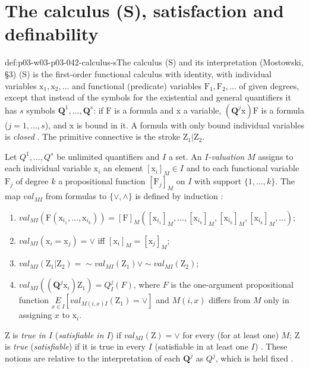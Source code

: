 \section{The calculus (S), satisfaction and definability}
\label{sec:p03-w03-p03-042-calculus}

\begin{hbdefinition}{def:p03-w03-p03-042-calculus-s}{The calculus (S) and its interpretation (Mostowski, \S3)}
(S) is the first-order functional calculus with identity, with individual
variables \(\mathrm x_1,\mathrm x_2,\ldots\) and functional (predicate)
variables \(\mathrm F_1,\mathrm F_2,\ldots\) of given degrees, except that
instead of the symbols for the existential and general quantifiers it has
\(s\) symbols \(\mathbf Q^1,\ldots,\mathbf Q^s\): if \(\mathrm F\) is a
formula and \(\mathrm x\) a variable, \((\mathbf Q^j\mathrm x)\mathrm F\)
is a formula (\(j=1,\ldots,s\)), and \(\mathrm x\) is bound in it.  A
formula with only bound individual variables is \emph{closed}
\cite[p.~15]{Mostowski1957}.  The primitive connective is the stroke
\(\mathrm Z_1|\mathrm Z_2\).

Let \(Q^1,\ldots,Q^s\) be unlimited quantifiers and \(I\) a set.  An
\emph{\(I\)-valuation} \(M\) assigns to each individual variable
\(\mathrm x_i\) an element \([\mathrm x_i]_M\in I\) and to each functional
variable \(\mathrm F_j\) of degree \(k\) a propositional function
\([\mathrm F_j]_M\) on \(I\) with support \(\{1,\ldots,k\}\).  The map
\(\mathit{val}_{MI}\) from formulas to \(\{\vee,\wedge\}\) is defined by
induction \cite[p.~16]{Mostowski1957}:
\begin{enumerate}
\item \(\mathit{val}_{MI}(\mathrm F(\mathrm x_{i_1},\ldots,\mathrm
      x_{i_k}))=[\mathrm F]_M([\mathrm x_{i_1}]_M,\ldots,[\mathrm
      x_{i_k}]_M,[\mathrm x_{i_k}]_M,[\mathrm x_{i_k}]_M,\ldots)\);
\item \(\mathit{val}_{MI}(\mathrm x_i=\mathrm x_j)=\vee\) iff
      \([\mathrm x_i]_M=[\mathrm x_j]_M\);
\item \(\mathit{val}_{MI}(\mathrm Z_1|\mathrm Z_2)={\sim}\mathit{val}_{MI}
      (\mathrm Z_1)\vee{\sim}\mathit{val}_{MI}(\mathrm Z_2)\);
\item \(\mathit{val}_{MI}((\mathbf Q^j\mathrm x_i)\mathrm Z_1)=Q^j_I(F)\),
      where \(F\) is the one-argument propositional function
      \(\underset{x\in I}{E}[\mathit{val}_{M(i,x)I}(\mathrm Z_1)=\vee]\) and
      \(M(i,x)\) differs from \(M\) only in assigning \(x\) to
      \(\mathrm x_i\).
\end{enumerate}
\(\mathrm Z\) is \emph{true in \(I\)} (\emph{satisfiable in \(I\)}) if
\(\mathit{val}_{MI}(\mathrm Z)=\vee\) for every (for at least one) \(M\);
\(\mathrm Z\) is \emph{true} (\emph{satisfiable}) if it is true in every
\(I\) (satisfiable in at least one \(I\)) \cite[p.~16]{Mostowski1957}.
These notions are relative to the interpretation of each \(\mathbf Q^j\)
as \(Q^j\), which is held fixed \cite[pp.~16--17]{Mostowski1957}.
\end{hbdefinition}

